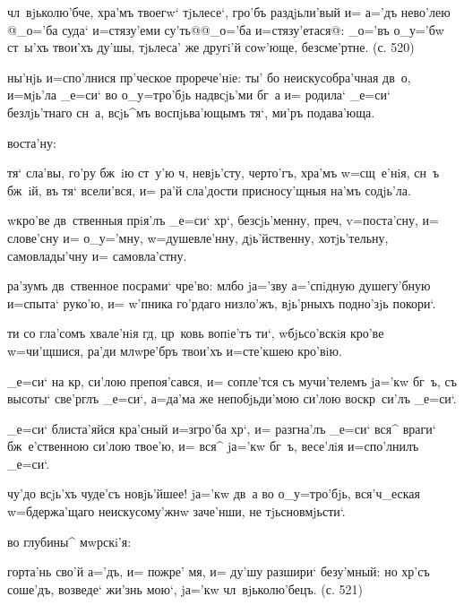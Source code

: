  чл~вjьколю'бче, хра'мъ твоегw` 
тjьлесе`, гро'бъ раздjьли'вый и= а='дъ нево'лею @_о='ба 
суда` и=стязу'еми су'ть@{@_о='ба и=стязу'етася@}: _о='въ 
о_у='бw ст~ы'хъ твои'хъ ду'шы, тjьлеса' же другi'й 
соw'юще, безсме'ртне. (с. 520)

  ны'нjь и=спо'лнися 
пр'ческое прорече'нiе: ты' бо неискусобра'чная дв~о, 
и=мjь'ла _е=си` во о_у=тро'бjь над\ъ всjь'ми бг~а и= 
родила` _е=си` безлjь'тнаго сн~а, всjь^мъ воспjьва'ющымъ 
тя`, ми'ръ подава'юща.

   воста'ну:

 тя` сла'вы, го'ру бж~iю ст~у'ю ч, 
невjь'сту, черто'гъ, хра'мъ w=сщ~е'нiя, сн~ъ бж~iй, въ 
тя` всели'вся, и= ра'й сла'дости присносу'щныя на'мъ 
содjь'ла.

 w\т кро'ве дв~ственныя прiя'лъ _е=си` 
хр`, безсjь'менну, преч, v=поста'сну, и= 
слове'сну и= о_у='мну, w=душевле'нну, дjь'йственну, 
хотjь'тельну, самовлады'чну и= самовла'стну.

 ра'зумъ дв~ственное посрами` чре'во: 
мл бо jа='зву а='спiдную душегу'бную и=спыта` 
руко'ю, и= w'пника го'рдаго низло'жъ, вjь'рныхъ 
под\ъ но'зjь покори`.


 ти со гла'сомъ хвале'нiя гд, 
цр~ковь вопiе'тъ ти`, w\т бjьсо'вскiя кро'ве w=чи'щшися, 
ра'ди мл w\т ре'бръ твои'хъ и=сте'кшею кро'вiю.

 _е=си` на кр, си'лою препоя'сався, и= 
сопле'тся съ мучи'телемъ jа='кw бг~ъ, съ высоты` све'рглъ 
_е=си`, а=да'ма же непобjьди'мою си'лою воскр~си'лъ 
_е=си`.

 _е=си` блиста'яйся кра'сный и=з\ъ гро'ба 
хр`, и= разгна'лъ _е=си` вся^ враги` бж~е'ственною 
си'лою твое'ю, и= вся^ jа='кw бг~ъ, весе'лiя и=спо'лнилъ 
_е=си`.

 чу'до всjь'хъ чуде'съ 
новjь'йшее! jа='кw дв~а во о_у=тро'бjь, вся'ч_еская 
w=бдержа'щаго неискусому'жнw заче'нши, не тjьсновмjьсти`.

  во глубины^ мwрскi'я:

 горта'нь сво'й а='дъ, и= пожре' мя, и= 
ду'шу разшири` безу'мный: но хр'съ соше'дъ, возведе` 
жи'знь мою`, jа='кw чл~вjьколю'бецъ. (с. 521)

